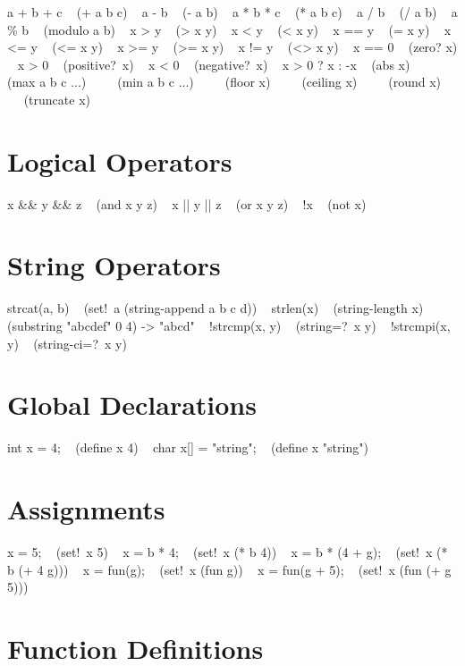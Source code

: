\split a + b + c ~ (+ a b c) ~
\split a - b ~ (- a b) ~
\split a * b * c ~ (* a b c) ~
\split a / b ~ (/ a b) ~
\split a \% b ~ (modulo a b) ~
\split x > y ~ (> x y) ~
\split x < y ~ (< x y) ~
\split x == y ~ (= x y) ~
\split x <= y ~ (<= x y) ~
\split x >= y ~ (>= x y) ~
\split x != y ~ (<> x y) ~
\split x == 0 ~ (zero? x) ~
\split x > 0 ~ (positive?\ x) ~
\split x < 0 ~ (negative?\ x) ~
\split x > 0 ? x : -x ~ (abs x) ~
\split \  ~ (max a b c ...) ~
\split \  ~ (min a b c ...) ~
\split \  ~ (floor x) ~
\split \  ~ (ceiling x) ~
\split \  ~ (round x) ~
\split \  ~ (truncate x) ~

\section{Logical Operators}

\split x \&\& y \&\& z ~ (and x y z) ~
\split x || y || z ~ (or x y z) ~
\split !x ~ (not x) ~

\vfil\break

\section{String Operators}

\split strcat(a, b) ~ (set!\ a (string-append a b c d)) ~
\split strlen(x) ~ (string-length x) ~
\split \  ~ (substring "abcdef" 0 4) -> "abcd" ~
\split !strcmp(x, y) ~ (string=?\ x y) ~
\split !strcmpi(x, y) ~ (string-ci=?\ x y) ~

\section{Global Declarations}

\split int  x = 4; ~ (define x 4) ~
\split char x[] = "string"; ~ (define x "string") ~

\section{Assignments}

\split x = 5; ~ (set!\ x 5) ~
\split x = b * 4; ~ (set!\ x (* b 4)) ~
\split x = b * (4 + g); ~ (set!\ x (* b (+ 4 g))) ~
\split x = fun(g); ~ (set!\ x (fun g)) ~
\split x = fun(g + 5); ~ (set!\ x (fun (+ g 5))) ~

\section{Function Definitions}

